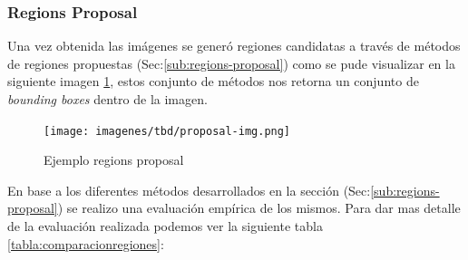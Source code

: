 \subsubsection*{Regions Proposal}

Una vez obtenida las imágenes se generó regiones candidatas a través de métodos de regiones propuestas (Sec:\ref{sub:regions-proposal}) como se pude visualizar en la siguiente imagen \ref{Fig:rp-ejemplo}, estos conjunto de métodos nos retorna  un conjunto de \textit{bounding boxes} dentro de la imagen.

\begin{figure}[H] \centering
  \texttt{[image: imagenes/tbd/proposal-img.png]}
  \caption{Ejemplo regions proposal}\label{Fig:rp-ejemplo}
\end{figure}



En base a los diferentes métodos desarrollados en la sección (Sec:\ref{sub:regions-proposal}) se realizo una evaluación empírica de los mismos. Para dar mas detalle de la evaluación realizada podemos ver la siguiente tabla \ref{tabla:comparacionregiones}:



